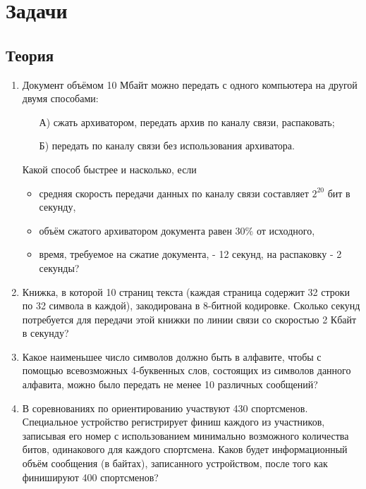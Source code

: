 \documentclass[12pt]{article}
\begin{document}
\section*{Задачи}
\subsection*{Теория}
\begin{enumerate}
\item Документ объёмом 10 Мбайт можно передать с одного компьютера на другой двумя способами:
	\begin{itemize}
			\vspace*{-2ex}
		    \setlength{\itemsep}{0pt}%
		    \setlength{\parskip}{0pt}%
		\item[А)] сжать архиватором, передать архив по каналу связи, распаковать; 
		\item[Б)] передать по каналу связи без использования архиватора.
	\end{itemize}
\vspace*{-1.7ex}
Какой способ быстрее и насколько, если
	\begin{itemize}
			\vspace*{-1.5ex}
			\setlength{\itemsep}{0pt}%
		    \setlength{\parskip}{0pt}%
		\item средняя скорость передачи данных по каналу связи составляет $2^{20}$ бит в секунду,
		\item объём сжатого архиватором документа равен 30\% от исходного,
		\item время, требуемое на сжатие документа, - 12 секунд, на распаковку - 2 секунды?
	\end{itemize}

\item Книжка, в которой 10 страниц текста (каждая страница содержит 32 строки по 32 символа в каждой), закодирована в 8-битной кодировке. Сколько секунд потребуется для передачи этой книжки по линии связи со скоростью 2 Кбайт в секунду?
\item Какое наименьшее число символов должно быть в алфавите, чтобы с помощью всевозможных 4-буквенных слов, состоящих из символов данного алфавита, можно было передать не менее 10 различных сообщений? 
\item В соревнованиях по ориентированию участвуют 430 спортсменов. Специальное устройство регистрирует финиш каждого из участников, записывая его номер с использованием минимально возможного количества битов, одинакового для каждого спортсмена. Каков будет информационный объём сообщения (в байтах), записанного устройством, после того как финишируют 400 спортсменов?
\end{enumerate}
\end{document}
